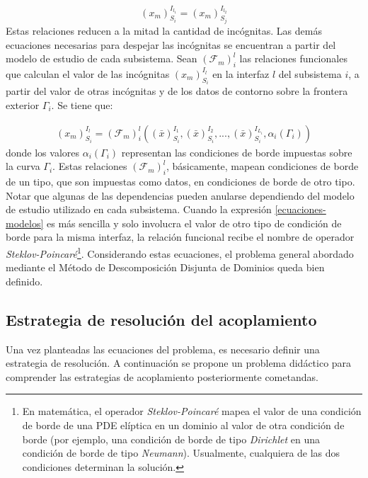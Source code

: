 \begin{equation}
{(x_m)_{S_i}^{I_{l_1}}}={(x_m)_{S_j}^{I_{l_2}}}
\label{continuidad}
\end{equation}
Estas relaciones reducen a la mitad la cantidad de incógnitas.
Las demás ecuaciones necesarias para despejar las incógnitas se encuentran a partir del modelo de estudio de cada subsistema. 
Sean $(\mathscr{F}_m)_{i}^{l}$ las relaciones funcionales que calculan el valor de las incógnitas ${(x_m)_{S_i}^{I_l}}$ en la interfaz $l$ del subsistema $i$,
a partir del valor de otras incógnitas y de los datos de contorno sobre la frontera exterior $\Gamma_i$.
Se tiene que:

\begin{equation}
\begin{split}
  (x_m)_{S_i}^{I_l} = (\mathscr{F}_m)_{i}^{l} \left ( (\bar{x})_{S_i}^{I_1}, (\bar{x})_{S_i}^{I_2}, ..., 
  (\bar{x})_{S_i}^{I_{L_i}}, \alpha_i({\Gamma_i}) \right )
\end{split}
\label{ecuaciones-modelos}
\end{equation}
donde los valores $\alpha_i({\Gamma_i})$ representan las condiciones de borde impuestas sobre la curva $\Gamma_i$.
Estas relaciones $(\mathscr{F}_m)_{i}^{l}$, básicamente, mapean condiciones de borde de un tipo, que son impuestas como datos, en condiciones de borde de otro tipo.
Notar que algunas de las dependencias pueden anularse dependiendo del modelo de estudio utilizado en cada subsistema.
Cuando la expresión \ref{ecuaciones-modelos} es más sencilla y solo involucra el valor de otro tipo de condición de borde para la misma interfaz,
la relación funcional recibe el nombre de operador \textit{Steklov-Poincaré}\footnote{
En matemática, el operador \textit{Steklov-Poincaré} mapea el valor de una condición de borde de una PDE elíptica en un dominio al valor
de otra condición de borde (por ejemplo, una condición de borde de tipo \textit{Dirichlet} en una condición de borde de tipo \textit{Neumann}).
Usualmente, cualquiera de las dos condiciones determinan la solución.
}.
Considerando estas ecuaciones, el problema general abordado mediante el Método de Descomposición Disjunta de Dominios queda bien definido.

\subsection*{Estrategia de resolución del acoplamiento}
\label{1:ecuaciones}
Una vez planteadas las ecuaciones del problema, es necesario definir una estrategia de resolución.
A continuación se propone un problema didáctico para comprender las estrategias de acoplamiento posteriormente cometandas.

